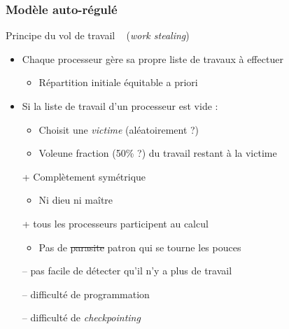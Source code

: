 \documentclass[xcolor={x11names,svgnames}]{beamer}
\begin{document}
\begin{frame}
\frametitle{Modèle auto-régulé}

\begin{exampleblock}{Principe du \og vol de travail \fg~ ({\it work stealing})}

\begin{itemize} 
\item Chaque processeur gère sa propre liste de travaux à
  effectuer

  \begin{itemize}
  \item Répartition initiale équitable a priori
  \end{itemize}

\item Si la liste de travail d'un processeur est vide :
  \begin{itemize}
  \item Choisit une \emph{victime} (aléatoirement ?)
  \item \og Vole\fg une fraction (50\% ?) du travail restant à la victime
  \end{itemize}
\end{itemize}
\end{exampleblock}

\bigskip

\begin{itemize}
\item [+] Complètement symétrique
  \begin{itemize}
  \item Ni dieu ni maître \CircledA
  \end{itemize}
  
\item [+] tous les processeurs participent au calcul
  \begin{itemize}
  \item Pas de \sout{parasite} patron qui se tourne les pouces
    
  \end{itemize}
\item [--] pas facile de détecter qu'il n'y a plus de travail
\item [--] difficulté de programmation
\item [--] difficulté de \emph{checkpointing}
\end{itemize}

\end{frame}
\end{document}
